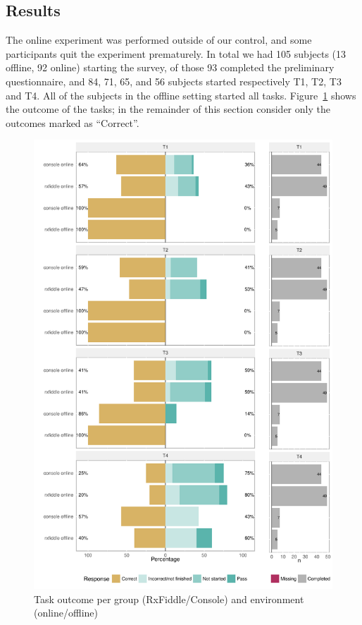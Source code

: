 \subsection{Results} The online experiment was performed outside of our
control, and some participants quit the experiment prematurely.  In
total we had 105 subjects (13 offline, 92 online) starting the survey,
of those 93 completed the preliminary questionnaire, and 84, 71, 65,
and 56 subjects started respectively T1, T2, T3 and T4.  All of the
subjects in the offline setting started all tasks.
Figure~\ref{fig:resultPerTask} shows the outcome of the tasks; in the 
remainder of this section consider only the outcomes marked as ``Correct''.

\begin{figure}[t]
    \includegraphics[width=\columnwidth]{images/resultPerTask.pdf}
    \caption{Task outcome per group (RxFiddle/Console) and environment (online/offline)}
    \label{fig:resultPerTask}
\end{figure}

